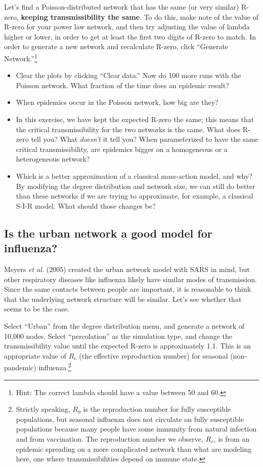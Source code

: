 \documentclass{article}
\begin{document}
Let's find a Poisson-distributed network that has the same (or very similar) R-zero, \textbf{keeping transmissibility the same}.  To do this, make note of the value of R-zero for your power law network, and then try adjusting the value of lambda higher or lower, in order to get at least the first two digits of R-zero to match.  In order to generate a new network and recalculate R-zero, click ``Generate Network.''\footnote{Hint: The correct lambda should have a value between 50 and 60.}

\begin{itemize}
 \item Clear the plots by clicking ``Clear data.''  Now do 100 more runs with the Poisson network.  What fraction of the time does an epidemic result?

 \item When epidemics occur in the Poisson network, how big are they?

 \item In this exercise, we have kept the expected R-zero the same; this means that the critical transmissibility for the two networks is the same.  What does R-zero tell you?  What \textit{doesn't} it tell you?  When parameterized to have the same critical transmissibility, are epidemics bigger on a homogeneous or a heterogeneous network?

 \item Which is a better approximation of a classical mass-action model, and why?  By modifying the degree distribution and network size, we can still do better than these networks if we are trying to approximate, for example, a classical S-I-R model.  What should those changes be?
\end{itemize}

\subsection{Is the urban network a good model for influenza?}
Meyers \textit{et al.} (2005) created the urban network model with SARS in mind, but other respiratory diseases like influenza likely have similar modes of transmission.  Since the same contacts between people are important, it is reasonable to think that the underlying network structure will be similar. Let's see whether that seems to be the case.

Select ``Urban'' from the degree distribution menu, and generate a network of 10,000 nodes.  Select ``percolation'' as the simulation type, and change the transmissibility value until the expected R-zero is approximately 1.1.  This is an appropriate value of $R_e$ (the effective reproduction number) for seasonal (non-pandemic) influenza.\footnote{Strictly speaking, $R_0$ is the reproduction number for fully susceptible populations, but seasonal influenza does not circulate on fully susceptible populations because many people have some immunity from natural infection and from vaccination.  The reproduction number we observe, $R_e$, is from an epidemic spreading on a more complicated network than what are modeling here, one where transmissibilities depend on immune state.}
\end{document}
